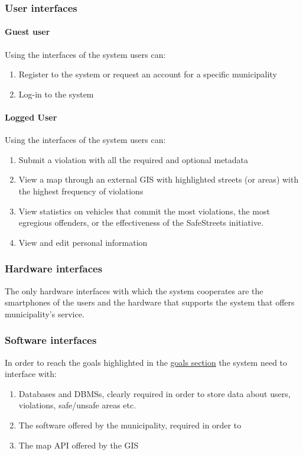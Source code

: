 \subsubsection{User interfaces}		
\paragraph{Guest user}
	Using the interfaces of the system users can:
	\begin{enumerate}
		\item Register to the system or request an account for a specific municipality
		\item Log-in to the system
	\end{enumerate}
\paragraph{Logged User}
	Using the interfaces of the system users can:
	\begin{enumerate}
		\item Submit a violation with all the required and optional metadata
		\item View a map through an external GIS with highlighted streets (or areas) with the highest frequency of violations
		\item View statistics on vehicles that commit the most violations, the most egregious offenders, or the effectiveness of the SafeStreets initiative.
		\item View and edit personal information
	\end{enumerate}
	
\subsubsection{Hardware interfaces}
	The only hardware interfaces with which the system cooperates are the smartphones of the users and the hardware that supports the system that offers municipality's service.
	
\subsubsection{Software interfaces}
	In order to reach the goals highlighted in the \hyperref[sec:goals]{goals section} the system need to interface with:
	\begin{enumerate}
		\item Databases and DBMSs, clearly required in order to store data about users, violations, safe/unsafe areas etc.
		\item The software offered by the municipality, required in order to 
		\item The map API offered by the GIS
	\end{enumerate}
	
